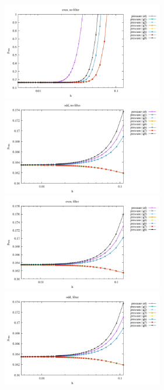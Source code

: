 \begin{center}
\includegraphics[width=7cm]{python_codes/fieldstone_12/results/rldc/prms_even_nofilter}
\includegraphics[width=7cm]{python_codes/fieldstone_12/results/rldc/prms_odd_nofilter}\\
\includegraphics[width=7cm]{python_codes/fieldstone_12/results/rldc/prms_even_filter}
\includegraphics[width=7cm]{python_codes/fieldstone_12/results/rldc/prms_odd_filter}\\
\end{center}

